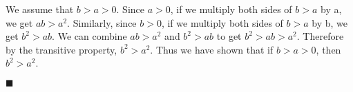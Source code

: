 \documentclass[12pt]{article}
\renewcommand{\qed}{\hfill$\blacksquare$}
\renewenvironment{proof}{\begin{addmargin}[1em]{0em}\begin{newproof}}{\end{newproof}\end{addmargin}\qed}
\begin{document}
\begin{proof}[Proof]
We assume that $b > a > 0$. Since $a > 0$, if we multiply both sides of $b > a$ by a, we get $ab > a^{2}$. Similarly, since $b > 0$, if we multiply both sides of $b > a$ by b, we get $b^{2} > ab$. We can combine $ab > a^{2}$ and $b^{2} > ab$ to get $b^{2} > ab > a^{2}$. Therefore by the transitive property, $b^{2} > a^{2}$. Thus we have shown that if $b > a > 0$, then $b^{2} > a^{2}$.

\end{proof}


 
\end{document}
